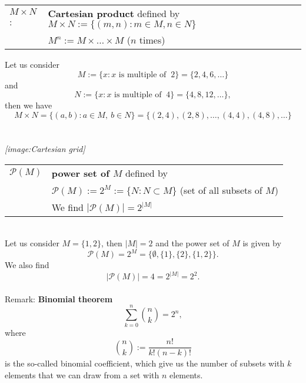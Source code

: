 \begin{frame}
	\begin{table}[h] \color{defgruen}
		\begin{tabular}[t]{ll}
			$M \times N$: & \textbf{Cartesian product} defined by 
			$M \times N :=\{(m,n)\colon m\in M,n\in N  \}$\vspace{0.2cm}\\\vspace{0.4cm}
			& $M^n := M \times \ldots \times M$ ($n$ times)
		\end{tabular}
	\end{table}
{
	\blank
Let us consider $$M:=\{ x : \text{$x$ is multiple of } ~2 \} = \{2, 4, 6, \ldots\}$$ and 
$$N:=\{ x : \text{$x$ is multiple of } ~4 \} = \{4, 8, 12, \ldots\},$$ then we have\\ 
$$M \times N = \{(a,b): a\in M, ~b\in N\} = \{ (2,4), (2,8),\ldots, (4,4), (4,8), \ldots \}$$ \\~\\
\textit{\small \color{header}[image:Cartesian grid]}
}
\end{frame}

\begin{frame}
\begin{table}[h] \color{defgruen}
	\begin{tabular}[t]{ll}
	$\mathcal{P} (M)$  & \textbf{power set of $M$} defined by\\
	&$\mathcal{P} (M) := 2^M :=\{ N: N\subset M\} $ (set of all subsets of $M$)\\
	&\vspace{0.2cm}We find $|\mathcal{P} (M)| = 2^{|M|}$
\end{tabular}
\end{table}
{
	\blank~\\

 Let us consider $M=\{ 1,2\}$, then $|M|=2$ and the power set of $M$ is given by
	\[\mathcal{P}(M)=2^M=\bigl\{\emptyset ,\{ 1\},\{ 2\},\{ 1,2\}\bigr\}.\]
	We also find
	$$|\mathcal{P}(M)|=4 = 2^{|M|}=2^2 . $$
	~\\
	Remark: \textbf{Binomial theorem}
	$$ \sum_{k=0}^n 	\binom{n}{k} =2^n,  $$
	where $$\binom{n}{k} := \frac{n!}{k!(n-k)!}$$ is the so-called binomial coefficient, which give us the number of subsets with $k$ elements that we can draw from a set with $n$ elements.

}
\end{frame}



